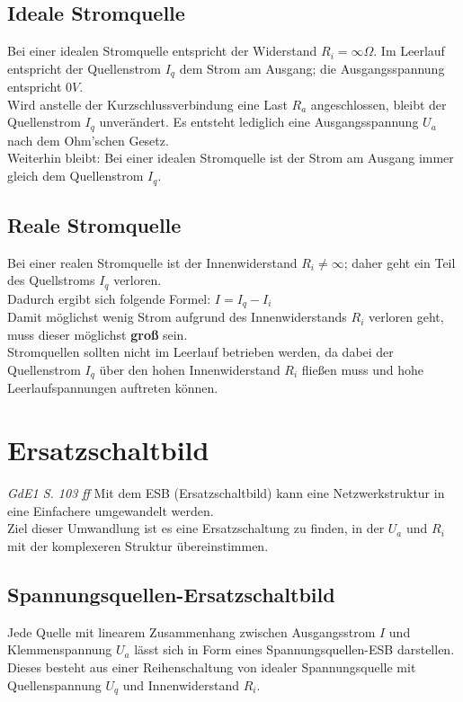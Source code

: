 \subsection{Ideale Stromquelle}
Bei einer idealen Stromquelle entspricht der Widerstand $R_i=\infty\Omega$. Im Leerlauf entspricht der Quellenstrom $I_q$ dem Strom am Ausgang; die Ausgangsspannung entspricht $0V$.\\

Wird anstelle der Kurzschlussverbindung eine Last $R_a$ angeschlossen, bleibt der Quellenstrom $I_q$ unverändert. Es entsteht lediglich eine Ausgangsspannung $U_a$ nach dem Ohm'schen Gesetz.\\
Weiterhin bleibt: Bei einer idealen Stromquelle ist der Strom am Ausgang immer gleich dem Quellenstrom $I_q$.

\subsection{Reale Stromquelle}
Bei einer realen Stromquelle ist der Innenwiderstand $R_i \neq \infty$; daher geht ein Teil des Quellstroms $I_q$ verloren.\\

Dadurch ergibt sich folgende Formel: $I=I_q - I_i$\\

Damit möglichst wenig Strom aufgrund des Innenwiderstands $R_i$ verloren geht, muss dieser möglichst \textbf{groß} sein.\\

Stromquellen sollten nicht im Leerlauf betrieben werden, da dabei der Quellenstrom $I_q$ über den hohen Innenwiderstand $R_i$ fließen muss und hohe Leerlaufspannungen auftreten können.

\section{Ersatzschaltbild}
\textit{GdE1 S. 103 ff}
Mit dem ESB (Ersatzschaltbild) kann eine Netzwerkstruktur in eine Einfachere umgewandelt werden.\\
Ziel dieser Umwandlung ist es eine Ersatzschaltung zu finden, in der $U_a$ und $R_i$ mit der komplexeren Struktur übereinstimmen.

\subsection{Spannungsquellen-Ersatzschaltbild}
Jede Quelle mit linearem Zusammenhang zwischen Ausgangsstrom $I$ und Klemmenspannung $U_a$ lässt sich in Form eines Spannungsquellen-ESB darstellen. Dieses besteht aus einer Reihenschaltung von idealer Spannungsquelle mit Quellenspannung $U_q$ und Innenwiderstand $R_i$.

